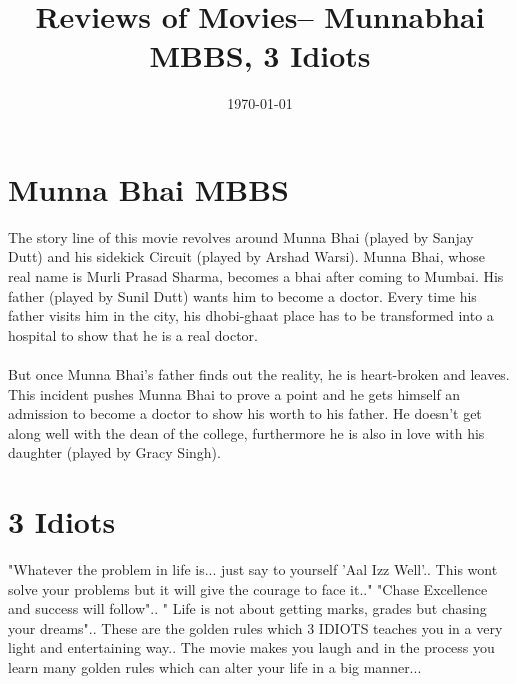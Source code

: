\documentclass{article}
\title{Reviews of Movies-- Munnabhai MBBS, 3 Idiots}
\date{\today}
\begin{document}
\maketitle

\section{Munna Bhai MBBS}
The story line of this movie revolves around Munna Bhai (played by Sanjay Dutt) and his sidekick Circuit (played by Arshad Warsi). Munna Bhai, whose real name is Murli Prasad Sharma, becomes a bhai after coming to Mumbai. His father (played by Sunil Dutt) wants him to become a doctor. Every time his father visits him in the city, his dhobi-ghaat place has to be transformed into a hospital to show that he is a real doctor. \\ \\

But once Munna Bhai's father finds out the reality, he is heart-broken and leaves. This incident pushes Munna Bhai to prove a point and he gets himself an admission to become a doctor to show his worth to his father. He doesn't get along well with the dean of the college, furthermore he is also in love with his daughter (played by Gracy Singh). 



\section{3 Idiots}

"Whatever the problem in life is... just say to yourself 'Aal Izz Well'.. This wont solve your problems but it will give the courage to face it.." "Chase Excellence and success will follow".. " Life is not about getting marks, grades but chasing your dreams".. These are the golden rules which 3 IDIOTS teaches you in a very light and entertaining way.. The movie makes you laugh and in the process you learn many golden rules which can alter your life in a big manner...
\end{document}
